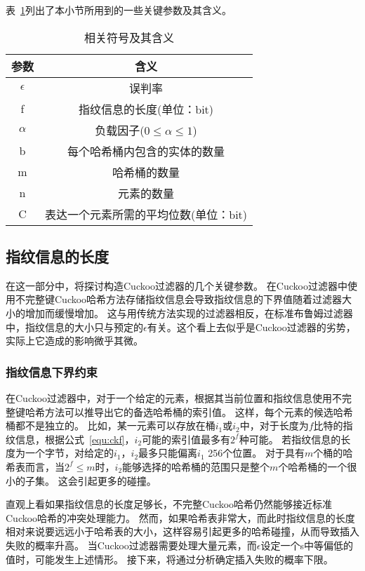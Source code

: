表~\ref{tab:ckf_para}列出了本小节所用到的一些关键参数及其含义。
\begin{table}[htbp]
  \centering
  \caption{相关符号及其含义}
  \label{tab:ckf_para}
  \begin{tabular}{cc}
    \toprule
      参数  & 含义  \\
    \midrule
      $\epsilon$  					  &   误判率 \\
        f 							  &   指纹信息的长度(单位：bit)\\
      $\alpha$					      &   负载因子($0\leq\alpha\leq 1$) \\
    	b                             &   每个哈希桶内包含的实体的数量 \\
    	m 							  &	  哈希桶的数量 \\
    	n                             &   元素的数量 \\
        C 							  &   表达一个元素所需的平均位数(单位：bit)\\
    \bottomrule
  \end{tabular}
\end{table}

\subsection{指纹信息的长度}
在这一部分中，将探讨构造Cuckoo过滤器的几个关键参数。
在Cuckoo过滤器中使用不完整键Cuckoo哈希方法存储指纹信息会导致指纹信息的下界值随着过滤器大小的增加而缓慢增加。
这与用传统方法实现的过滤器相反，在标准布鲁姆过滤器中，指纹信息的大小只与预定的$\epsilon$有关。这个看上去似乎是Cuckoo过滤器的劣势，实际上它造成的影响微乎其微。

\subsubsection{指纹信息下界约束}
在Cuckoo过滤器中，对于一个给定的元素，根据其当前位置和指纹信息使用不完整键哈希方法可以推导出它的备选哈希桶的索引值。
这样，每个元素的候选哈希桶都不是独立的。
比如，某一元素可以存放在桶$i_1$或$i_2$中，对于长度为$f$比特的指纹信息，根据公式~\ref{equ:ckf}，$i_2$可能的索引值最多有$2^f$种可能。
若指纹信息的长度为一个字节，对给定的$i_1$，$i_2$最多只能偏离$i_1$ 256个位置。
对于具有$m$个桶的哈希表而言，当$2^f \leq m$时，$i_2$能够选择的哈希桶的范围只是整个$m$个哈希桶的一个很小的子集。
这会引起更多的碰撞。

直观上看如果指纹信息的长度足够长，不完整Cuckoo哈希仍然能够接近标准Cuckoo哈希的冲突处理能力。
然而，如果哈希表非常大，而此时指纹信息的长度相对来说要远远小于哈希表的大小，这样容易引起更多的哈希碰撞，从而导致插入失败的概率升高。
当Cuckoo过滤器需要处理大量元素，而$\epsilon$设定一个s中等偏低的值时，可能发生上述情形。
接下来，将通过分析确定插入失败的概率下限。

